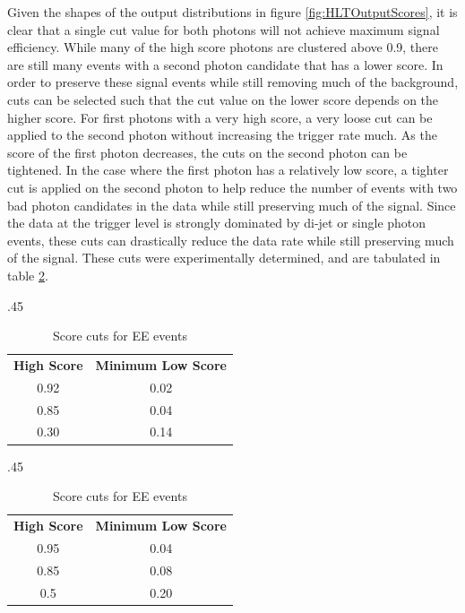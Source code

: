 \documentclass[12pt]{ucsddissertation}
\begin{document}
Given the shapes of the output distributions in figure \ref{fig:HLTOutputScores}, it is clear that a single cut value for both photons will not achieve maximum signal efficiency. While many of the high score photons are clustered above 0.9, there are still many events with a second photon candidate that has a lower score. In order to preserve these signal events while still removing much of the background, cuts can be selected such that the cut value on the lower score depends on the higher score. For first photons with a very high score, a very loose cut can be applied to the second photon without increasing the trigger rate much. As the score of the first photon decreases, the cuts on the second photon can be tightened. In the case where the first photon has a relatively low score, a tighter cut is applied on the second photon to help reduce the number of events with two bad photon candidates in the data while still preserving much of the signal. Since the data at the trigger level is strongly dominated by di-jet or single photon events, these cuts can drastically reduce the data rate while still preserving much of the signal. These cuts were experimentally determined, and are tabulated in table \ref{tab:HLTScoreCuts}.

\begin{table}[h]
    \centering
    \caption{Chosen score cuts for BB and EE events}
	\label{tab:HLTScoreCuts}
    \begin{subtable}{.45\textwidth}
        \centering
        \caption{Score cuts for BB events}
        \begin{tabular}{|c|c|}
            \hline
            \textbf{High Score} & \textbf{Minimum Low Score} \\
			\Xhline{2pt}
            0.92 & 0.02 \\ \hline
            0.85 & 0.04 \\ \hline
            0.30 & 0.14 \\ \hline
        \end{tabular}
    \end{subtable}
    \hfill
    \begin{subtable}{.45\textwidth}
        \centering
        \caption{Score cuts for EE events}
        \begin{tabular}{|c|c|}
            \hline
			\textbf{High Score} & \textbf{Minimum Low Score} \\
			\Xhline{2pt}
            0.95 & 0.04 \\ \hline
            0.85 & 0.08 \\ \hline
            0.5 & 0.20 \\ \hline
        \end{tabular}
    \end{subtable}
\end{table}
\end{document}
